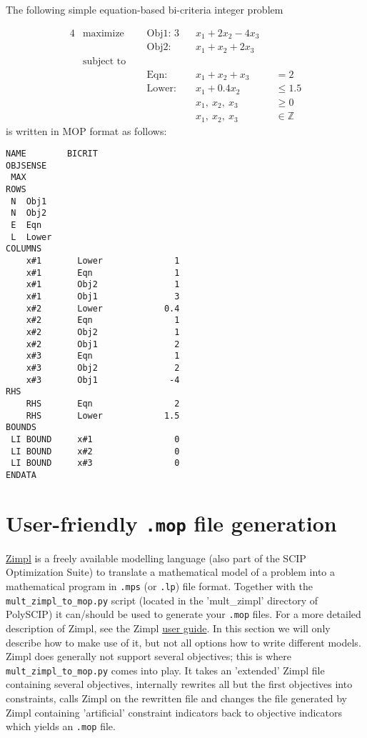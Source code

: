 \documentclass[11pt,listof=totoc]{scrartcl}
\theoremstyle{definition}
\begin{document}
The following simple equation-based bi-criteria
integer problem

\begin{alignat*}{4}
&\mbox{maximize}~~~ &&\mbox{Obj1: } 3&&x_1 + 2 x_2 - 4 x_3 &&\\
& &&\mbox{Obj2: } &&x_1 + x_2 + 2 x_3 &&\\
&\mbox{subject to} && && && \\
& &&\mbox{Eqn: } &&x_1 + x_2 + x_3 &&= 2 \\
& &&\mbox{Lower: } &&x_1 + 0.4 x_2 &&\leq 1.5 \\
& && &&x_1,~ x_2,~ x_3 &&\geq 0 \\
& && &&x_1,~ x_2,~ x_3 &&\in \mathbb{Z}
\end{alignat*}
is written in MOP format as follows:
\begin{verbatim}
NAME        BICRIT
OBJSENSE 
 MAX
ROWS
 N  Obj1            
 N  Obj2            
 E  Eqn             
 L  Lower           
COLUMNS
    x#1       Lower              1
    x#1       Eqn                1
    x#1       Obj2               1
    x#1       Obj1               3
    x#2       Lower            0.4
    x#2       Eqn                1
    x#2       Obj2               1
    x#2       Obj1               2
    x#3       Eqn                1
    x#3       Obj2               2
    x#3       Obj1              -4
RHS
    RHS       Eqn                2
    RHS       Lower            1.5
BOUNDS
 LI BOUND     x#1                0
 LI BOUND     x#2                0
 LI BOUND     x#3                0
ENDATA
\end{verbatim}

\section{User-friendly \texttt{.mop} file generation}\label{sec-model}

\href{http://zimpl.zib.de}{Zimpl} is a freely available modelling
language (also part of the SCIP Optimization Suite) to translate a
mathematical model of a problem into a mathematical program in
\texttt{.mps} (or \texttt{.lp}) file format. Together with the
\texttt{mult\_zimpl\_to\_mop.py} script (located in the 'mult\_zimpl'
directory of PolySCIP) it can/should be used to generate your
\texttt{.mop} files. For a more detailed description of Zimpl, see the
Zimpl \href{http://zimpl.zib.de/download/zimpl.pdf}{user guide}. In
this section we will only describe how to make use of it, but not all
options how to write different models. Zimpl does generally not support several
objectives; this is where \texttt{mult\_zimpl\_to\_mop.py} comes into
play. It takes an 'extended' Zimpl file containing several objectives,
internally rewrites all but the first objectives into constraints,
calls Zimpl on the rewritten file and changes the file generated by Zimpl
containing 'artificial' constraint indicators back to objective
indicators which yields an \texttt{.mop} file.
\end{document}
